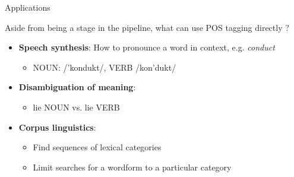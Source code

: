 \documentclass{beamer}
\begin{document}
\begin{frame}{Applications}

Aside from being a stage in the pipeline, what can use POS tagging directly ? 

\begin{itemize}
  \item \textbf{Speech synthesis}: How to pronounce a word in context, e.g. \emph{conduct}
  \begin{itemize}
     \item NOUN: /'kondukt/, VERB /kon'dukt/
  \end{itemize}
  \item \textbf{Disambiguation of meaning}:  
  \begin{itemize}
     \item lie NOUN vs. lie VERB
  \end{itemize}
  \item \textbf{Corpus linguistics}:
  \begin{itemize}
    \item Find sequences of lexical categories
    \item Limit searches for a wordform to a particular category
  \end{itemize}

\end{itemize}


\end{frame}
\end{document}
